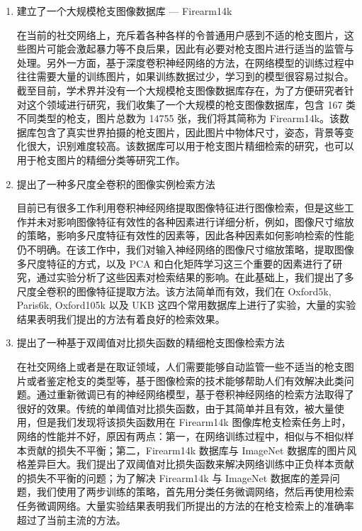 \begin{enumerate}
\item 建立了一个大规模枪支图像数据库 --- Firearm14k

在当前的社交网络上，充斥着各种各样的令普通用户感到不适的枪支图片，这些图片可能会激起暴力等不良后果，因此有必要对枪支图片进行适当的监管与处理。另外一方面，基于深度卷积神经网络的方法，在网络模型的训练过程中往往需要大量的训练图片，如果训练数据过少，学习到的模型很容易过拟合。截至目前，学术界并没有一个大规模枪支图像数据库存在，为了方便研究者针对这个领域进行研究，我们收集了一个大规模的枪支图像数据库，包含 167 类不同类型的枪支，图片总数为 14755 张，我们将其简称为 Firearm14k。该数据库包含了真实世界拍摄的枪支图片，因此图片中物体尺寸，姿态，背景等变化很大，识别难度较高。该数据库可以用于枪支图片精细检索的研究，也可以用于枪支图片的精细分类等研究工作。

\item 提出了一种多尺度全卷积的图像实例检索方法

目前已有很多工作利用卷积神经网络提取图像特征进行图像检索，但是这些工作并未对影响图像特征有效性的各种因素进行详细分析，例如，图像尺寸缩放的策略，影响多尺度特征有效性的因素等，因此各种因素如何影响检索的性能仍不明确。在该工作中，我们对输入神经网络的图像尺寸缩放策略，提取图像多尺度特征的方式，以及 PCA 和白化矩阵学习这三个重要的因素进行了研究，通过实验分析了这些因素对检索结果的影响。在此基础上，我们提出了多尺度全卷积的图像特征提取方法。该方法简单而有效，我们在 Oxford5k, Paris6k, Oxford105k 以及 UKB 这四个常用数据库上进行了实验，大量的实验结果表明我们提出的方法有着良好的检索效果。

\item 提出了一种基于双阈值对比损失函数的精细枪支图像检索方法

在社交网络上或者是在取证领域，人们需要能够自动监管一些不适当的枪支图片或者鉴定枪支的类型等，基于图像检索的技术能够帮助人们有效解决此类问题。通过重新微调已有的神经网络模型，基于卷积神经网络的检索方法取得了很好的效果。传统的单阈值对比损失函数，由于其简单并且有效，被大量使用，但是我们发现将该损失函数用在 Firearm14k 图像库枪支检索任务上时，网络的性能并不好，原因有两点：第一，在网络训练过程中，相似与不相似样本贡献的损失不平衡；第二，Firearm14k 数据库与 ImageNet 数据库的图片风格差异巨大。我们提出了双阈值对比损失函数来解决网络训练中正负样本贡献的损失不平衡的问题；为了解决 Firearm14k 与 ImageNet 数据库的差异问题，我们使用了两步训练的策略，首先用分类任务微调网络，然后再使用检索任务微调网络。大量实验结果表明我们所提出的方法的在枪支检索上的准确率超过了当前主流的方法。

\end{enumerate}
